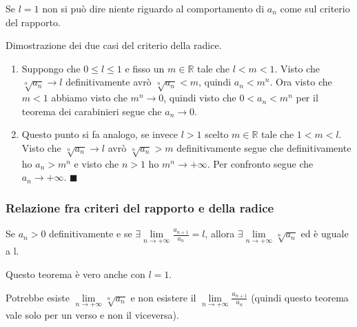 \begin{observation}
Se $l=1$ non si può dire niente riguardo al comportamento di $a_n$ come sul criterio del rapporto.
\end{observation}

\begin{demostration}
Dimostrazione dei due casi del criterio della radice.
\begin{enumerate}
    \item Suppongo che $0 \leq l \leq 1$ e fisso un $m\in \mathbb{R}$ tale che $l < m < 1$. Visto che $\sqrt[n]{a_n}\to l$ definitivamente avrò $\sqrt[n]{a_n} < m$, quindi $a_n < m^n$. Ora visto che $m < 1$ abbiamo visto che $m^n \to 0$, quindi visto che $0 < a_n < m^n$ per il teorema dei carabinieri segue che $a_n \to 0$.
    \item Questo punto si fa analogo, se invece $l > 1$ scelto $m \in \mathbb{R}$ tale che $1 < m < l$. Visto che $\sqrt[n]{a_n} \to l$ avrò $\sqrt[n]{a_n} > m$ definitivamente segue che definitivamente ho $a_n > m^n$ e visto che $n > 1$ ho $m^n \to +\infty$. Per confronto segue che $a_n \to +\infty$. $\blacksquare$
\end{enumerate}
\end{demostration}

\subsubsection{Relazione fra criteri del rapporto e della radice}
\begin{theorem}
Se $a_n > 0$ definitivamente e se $\exists \lim\limits_{n\to +\infty}\frac{a_{n+1}}{a_n} = l$, allora $\exists \lim\limits_{n\to +\infty}\sqrt[n]{a_n}$ ed è uguale a l.
\end{theorem}

\begin{observation}
Questo teorema è vero anche con $l=1$.
\end{observation}

\begin{observation}
Potrebbe esiste $\lim\limits_{n\to +\infty}\sqrt[n]{a_n}$ e non esistere il $\lim\limits_{n\to +\infty} \frac{a_{n+1}}{a_n}$ (quindi questo teorema vale solo per un verso e non il viceversa).
\end{observation}

